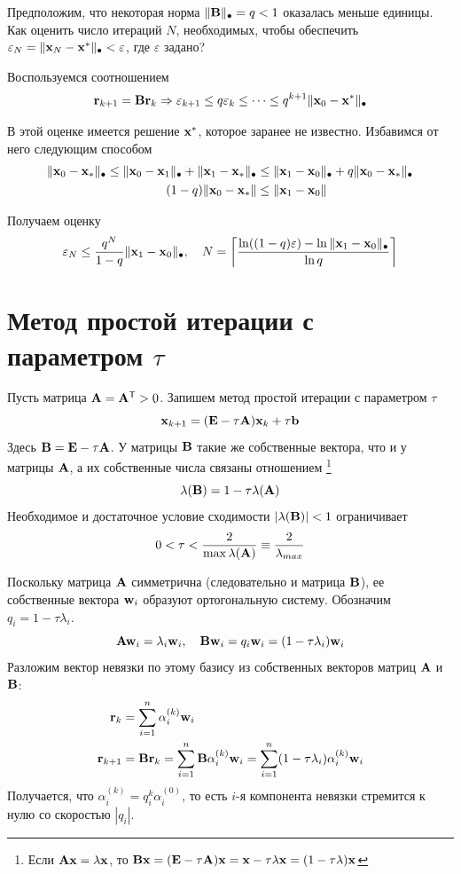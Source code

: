 \documentclass[professionalfonts,compress,unicode]{beamer}
\begin{document}
{
    Предположим, что некоторая норма $\|{\bf B}\|_\bullet = q < 1$ оказалась
    меньше единицы. Как оценить число итераций $N$, необходимых, чтобы обеспечить
    $\varepsilon_N = \|{\bf x}_N - {\bf x}^*\|_\bullet < \varepsilon$, где $\varepsilon$ задано?

    Воспользуемся соотношением
    \begin{equation*}
    {\bf r}_{k+1} = {\bf B} {\bf r}_k \Rightarrow 
    \varepsilon_{k+1} \leq q \varepsilon_k \leq \dots \leq 
    q^{k+1} \|{\bf x}_0 - {\bf x}^*\|_\bullet
    \end{equation*}

    В этой оценке имеется решение ${\bf x}^*$, которое заранее не известно. Избавимся
    от него следующим способом
    \begin{align*}
    \|{\bf x}_0 - {\bf x}_*\|_\bullet \leq 
    \|{\bf x}_0 - {\bf x}_1\|_\bullet + \|{\bf x}_1 - {\bf x}_*\|_\bullet &\leq
    \|{\bf x}_1 - {\bf x}_0\|_\bullet + q\|{\bf x}_0 - {\bf x}_*\|_\bullet\\
    (1-q)\|{\bf x}_0 - {\bf x}_*\| &\leq \|{\bf x}_1 - {\bf x}_0\|
    \end{align*}

    Получаем оценку
    \begin{equation*}
    \varepsilon_N \leq \frac{q^N}{1-q} \|{\bf x}_1 - {\bf x}_0\|_\bullet, 
    \quad N = \left\lceil \frac{\ln ((1-q) \varepsilon) - 
    \ln \|{\bf x}_1 - {\bf x}_0\|_\bullet}{\ln q}\right\rceil
    \end{equation*}
}


\section{Метод простой итерации с параметром $\tau$}

{
    Пусть матрица ${\bf A} = {\bf A}^\mathsf{T} > 0$. Запишем метод простой итерации с
    параметром $\tau$
	$$
	{\bf x}_{k+1} = ({\bf E} - \tau {\bf A}) {\bf x}_k + \tau {\bf b}
	$$
    Здесь ${\bf B} = {\bf E} - \tau {\bf A}$.
	У матрицы ${\bf B}$ такие же собственные вектора, что и у матрицы ${\bf A}$, а их 
	собственные числа связаны отношением
	\footnote{Если ${\bf A} {\bf x} = \lambda {\bf x}$, то
	$
	{\bf B} {\bf x} = ({\bf E} - \tau {\bf A}) {\bf x} = {\bf x} - \tau \lambda {\bf x} = (1 - \tau \lambda) {\bf x}
	$}
	$$
	\lambda({\bf B}) = 1 - \tau \lambda({\bf A})
	$$
    Необходимое и достаточное условие сходимости $|\lambda({\bf B})| < 1$
    ограничивает
    $$
    0 < \tau < \frac{2}{\max \lambda({\bf A})} \equiv \frac{2}{\lambda_{max}}
    $$
}

{
    Поскольку матрица ${\bf A}$ симметрична (следовательно и матрица ${\bf B}$), ее
    собственные вектора ${\bf w}_i$ образуют ортогональную систему. Обозначим
    $q_i = 1- \tau \lambda_i$.
    $$ {\bf A} {\bf w}_i = \lambda_i {\bf w}_i, \quad {\bf B} {\bf w}_i = q_i {\bf w}_i = (1 - \tau \lambda_i) {\bf w}_i$$
    Разложим вектор невязки
    по этому базису из собственных векторов матриц ${\bf A}$ и ${\bf B}$:
    \begin{align*}
    {\bf r}_k &= \sum_{i=1}^n \alpha_i^{(k)} {\bf w}_i\\
    {\bf r}_{k+1} &= {\bf B}{\bf r}_k = \sum_{i=1}^n {\bf B} \alpha_i^{(k)} {\bf w}_i = \sum_{i=1}^n
    (1-\tau\lambda_i)\alpha^{(k)}_i {\bf w}_i
    \end{align*}
    Получается, что $\alpha^{(k)}_i = q_i^k \alpha^{(0)}_i$, то есть $i$-я
    компонента невязки стремится к нулю со скоростью $|q_i|$.
}
\end{document}
